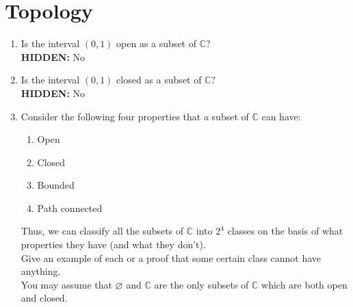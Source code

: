 \documentclass[12pt]{article}
\theoremstyle{definition}
\numberwithin{thm}{section}
\let\emptyset\varnothing
\newcommand{\hint}[1]{\textbf{HIDDEN:} {\color[rgb]{0.95, 0.95, 0.95}#1}}
\begin{document}
\begin{enumerate}
\end{enumerate}
\newpage\section{Topology}
\begin{enumerate}
	\item Is the interval $(0, 1)$ open as a subset of $\mathbb{C}?$\\
	\hint{No}
	\item Is the interval $(0, 1)$ closed as a subset of $\mathbb{C}?$\\
	\hint{No}
	\item Consider the following four properties that a subset of $\mathbb{C}$ can have:
	\begin{enumerate}
		\item Open
		\item Closed
		\item Bounded
		\item Path connected
	\end{enumerate}
	Thus, we can classify all the subsets of $\mathbb{C}$ into $2^4$ classes on the basis of what properties they have (and what they don't).\\
	Give an example of each or a proof that some certain class cannot have anything.\\
	You may assume that $\emptyset$ and $\mathbb{C}$ are the only subsets of $\mathbb{C}$ which are both open and closed.
\end{enumerate}
\end{document}
